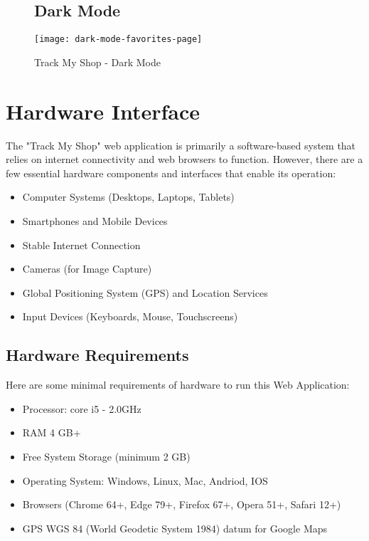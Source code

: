 \begin{figure}[h]
	\subsection{Dark Mode }
	\centering
	\texttt{[image: dark-mode-favorites-page]}
	\caption{Track My Shop - Dark Mode}
\end{figure}

\pagebreak
\section{Hardware Interface}
The "Track My Shop" web application is primarily a software-based system that relies on internet connectivity and web browsers to function. However, there are a few essential hardware components and interfaces that enable its operation:

\begin{itemize}
	\item Computer Systems (Desktops, Laptops, Tablets)
	\item Smartphones and Mobile Devices
	\item Stable Internet Connection
	\item Cameras (for Image Capture)
	\item Global Positioning System (GPS) and Location Services
	\item Input Devices (Keyboards, Mouse, Touchscreens)
\end{itemize}

\subsection{Hardware Requirements}
Here are some minimal requirements of hardware to run this Web Application:
\begin{itemize}
	\item Processor: core i5 - 2.0GHz  
	\item RAM 4 GB+ 
	\item Free System Storage (minimum 2 GB)
	\item Operating System: Windows, Linux, Mac, Andriod, IOS
	\item Browsers (Chrome 64+, Edge 79+, Firefox 67+, Opera 51+, Safari 12+)
	\item GPS WGS 84 (World Geodetic System 1984) datum for Google Maps 
\end{itemize}


